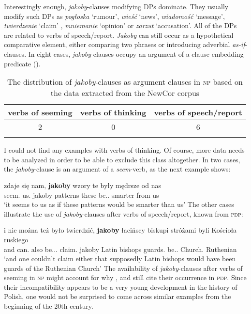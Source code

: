 \documentclass[output=paper]{langsci/langscibook}
\begin{document}
 Interestingly enough, \emph{jakoby}-clauses modifying DPs dominate. They usually modify such DPs as \emph{pogłoska} `rumour', \emph{wieść} `news', \emph{wiadomość} `message',  \emph{twier\-dzenie} `claim' , \emph{mniemanie} `opinion' or \emph{zarzut} `accusation'. All of the DPs are related to verbs of speech\slash report. \emph{Jakoby} can still occur as a hypothetical comparative element, either comparing two phrases or introducing adverbial \emph{as-if}-clauses. In eight cases, \emph{jakoby}-clauses occupy an argument of a clause-embed\-ding predicate ().

 \begin{table}[h]  \begin{tabular}{ccc}
\lsptoprule
verbs of seeming & verbs of thinking & verbs of speech\slash report \\
\midrule
2 & 0 & 6  \\
\lspbottomrule
\end{tabular}
\caption{The distribution of \emph{jakoby}-clauses as argument clauses in \textsc{np} based on the data extracted from the NewCor corpus} \label{staropolski_nowopolski_argument}
\end{table}

 I could not find any examples with verbs of thinking. Of course, more data needs to be analyzed in order to be able to exclude this class altogether. In two cases, the \emph{jakoby}-clause is an argument of a \emph{seem}-verb, as the next example shows:

\ea \gll zdaje się nam, \textbf{jakoby} wzory te były mędrsze od nas \\
		seem.{\thirdperson}{\sg} {} us.{\dat} jakoby	patterns these be.{\lptcp}.{\nvir} smarter from us \\
\glt	`it seems to us as if these patterns would be smarter than us' 
\z
The other cases illustrate the use of \emph{jakoby}-clauses after verbs of speech\slash report, known from \textsc{pdp}:

\ea \gll i nie można też było twierdzić, \textbf{jakoby} łacińscy biskupi stróżami byli Kościoła ruskiego \\
		and {\negation} can.{\pred} also be.{\lptcp}.{\sg}.{\n} claim.{\infv} jakoby Latin bishops guards.{\ins} be.{\lptcp}.{\vir} Church.{\gen} Ruthenian \\
\glt	`and one couldn't claim either that supposedly Latin bishops would have been guards of the Ruthenian Church' 
\z
The availability of \emph{jakoby}-clauses after verbs of seeming in \textsc{np} might account for why \textcite{ojasiewicz1992}, \textcite{Wiemer2005} and \textcite{Taborek2008} still cite their occurrence in \textsc{pdp}. Since their incompatibility appears to be a very young development in the history of Polish, one would not be surprised to come across similar examples from the beginning of the 20th century.
\end{document}
